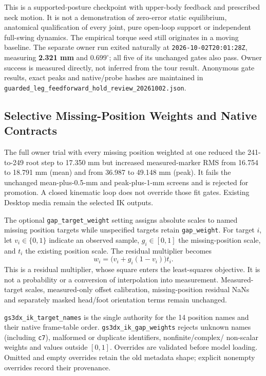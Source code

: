 \documentclass[11pt,a4paper]{article}
\begin{document}
This is a supported-posture checkpoint with upper-body feedback and
prescribed neck motion. It is not a demonstration of zero-error static
equilibrium, anatomical qualification of every joint, pure open-loop
support or independent full-swing dynamics. The empirical torque seed
still originates in a moving baseline. The separate owner run exited naturally at
\texttt{2026-10-02T20:01:28Z}, measuring \textbf{2.321 mm} and
\textbf{$0.699^\circ$}; all five of its unchanged gates also pass.
Owner success is measured directly, not inferred from the tour result. Anonymous gate results,
exact peaks and native/probe hashes are maintained in
\texttt{guarded\_leg\_feedforward\_hold\_review\_20261002.json}.


\subsection{Selective Missing-Position Weights and Native Contracts}
The full owner trial with every missing position weighted at one reduced
the 241-to-249 root step to 17.350 mm but increased measured-marker RMS
from 16.754 to 18.791 mm (mean) and from 36.987 to 49.148 mm (peak).
It fails the unchanged mean-plus-0.5-mm and peak-plus-1-mm screens and
is rejected for promotion. A closed kinematic loop does not override
those fit gates. Existing Desktop media remain the selected IK outputs.

The optional \texttt{gap\_target\_weight} setting assigns absolute scales
to named missing position targets while unspecified targets retain
\texttt{gap\_weight}. For target $i$, let $v_i\in\{0,1\}$ indicate an
observed sample, $g_i\in[0,1]$ the missing-position scale, and $t_i$ the
existing position scale. The residual multiplier becomes
\[
 w_i=\bigl(v_i+g_i(1-v_i)\bigr)t_i.
\]
This is a residual multiplier, whose square enters the least-squares
objective. It is not a probability or a conversion of interpolation
into measurement. Measured-target scales, measured-only offset
calibration, missing-position residual NaNs and separately masked
head/foot orientation terms remain unchanged.

\texttt{gs3dx\_ik\_target\_names} is the single authority for the
14 position names and their native frame-table order.
\texttt{gs3dx\_ik\_gap\_weights} rejects unknown names (including
\texttt{c7}), malformed or duplicate identifiers, nonfinite/complex/
non-scalar weights and values outside $[0,1]$. Overrides are validated
before model loading. Omitted and empty overrides retain the old
metadata shape; explicit nonempty overrides record their provenance.
\end{document}
